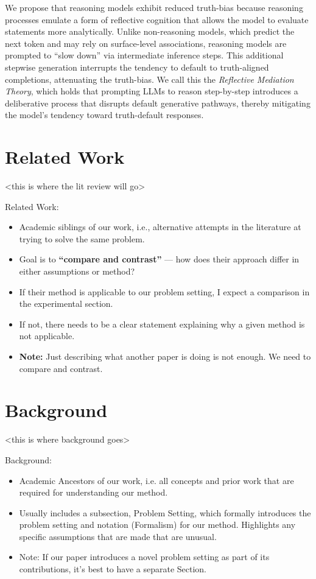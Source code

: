 \documentclass{article}
\begin{document}
We propose that reasoning models exhibit reduced truth-bias because reasoning processes emulate a form of reflective cognition that allows the model to evaluate statements more analytically. Unlike non-reasoning models, which predict the next token and may rely on surface-level associations, reasoning models are prompted to ``slow down'' via intermediate inference steps. This additional stepwise generation interrupts the tendency to default to truth-aligned completions, attenuating the truth-bias. We call this the \textit{Reflective Mediation Theory}, which holds that prompting LLMs to reason step-by-step introduces a deliberative process that disrupts default generative pathways, thereby mitigating the model’s tendency toward truth-default responses.

\section{Related Work}



<this is where the lit review will go>

Related Work:

\begin{itemize}
    \item Academic siblings of our work, i.e., alternative attempts in the literature at trying to solve the same problem.
    \item Goal is to \textbf{“compare and contrast”} — how does their approach differ in either assumptions or method?
    \item If their method is applicable to our problem setting, I expect a comparison in the experimental section.
    \item If not, there needs to be a clear statement explaining why a given method is not applicable.
    \item \textbf{Note:} Just describing what another paper is doing is not enough. We need to compare and contrast.
\end{itemize}

\section{Background}

<this is where background goes>

Background:
\begin{itemize}
    \item Academic Ancestors of our work, i.e. all concepts and prior work that are required for understanding our method. 
    \item Usually includes a subsection, Problem Setting, which formally introduces the problem setting and notation (Formalism) for our method. Highlights any specific assumptions that are made that are unusual. 
    \item Note: If our paper introduces a novel problem setting as part of its contributions, it’s best to have a separate Section.
\end{itemize}
\end{document}
